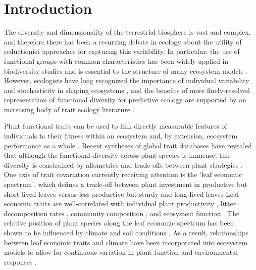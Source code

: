 \section{Introduction}
\label{sec:mvtraits-intro}

The diversity and dimensionality of the terrestrial biosphere is vast and complex, and therefore there has been a recurring debate in ecology about the utility of reductionist approaches for capturing this variability.
In particular, the use of functional groups with common characteristics has been widely applied in biodiversity studies \cite{naeem_disentangling_2003} and is essential to the structure of many ecosystem models \cite{lavorel_plant_1997,wullschleger_plant_2014}.
However, ecologists have long recognized the importance of individual variability and stochasticity in shaping ecosystems
\cite{gleason_individualistic_1926,bolnick_why_2011,rosindell_unified_2011,clark_why_2016},
and the benefits of more finely-resolved representation of functional diversity for predictive ecology are supported by an increasing body of trait ecology literature
\cite{mayfield_diversity_2006,mcmahon_improving_2011,van_bodegom_going_2012,reichstein_linking_2014,violle_emergence_2014,medlyn_using_2015,moran_intraspecific_2016}.

Plant functional traits can be used to link directly measurable features of individuals to their fitness within an ecosystem and, by extension, ecosystem performance as a whole \cite{violle_let_2007}.
Recent syntheses of global trait databases have revealed that although the functional diversity across plant species is immense, this diversity is constrained by allometries and trade-offs between plant strategies \cite{wright_worldwide_2004,kattge_try_2011,kleyer_why_2015,diaz_global_2016}.
One axis of trait covariation currently receiving attention is the ‘leaf economic spectrum’, which defines a trade-off between plant investment in productive but short-lived leaves versus less productive but sturdy and long-lived leaves \cite{wright_worldwide_2004,shipley_fundamental_2006,reich_world-wide_2014,diaz_global_2016}
Leaf economic traits are well-correlated with
individual plant productivity \cite{shipley_functional_2005,niinemets_within-canopy_2016,wu_convergence_2016},
litter decomposition rates \cite{bakker_leaf_2011,hobbie_plant_2015},
community composition \cite{burns_patterns_2004,cavender-bares_multiple_2004},
and ecosystem function \cite{diaz_plant_2004,musavi_imprint_2015}.
The relative position of plant species along the leaf economic spectrum has been shown to be influenced by climate and soil conditions
\cite{wright_worldwide_2004,wright_modulation_2005,cornwell_community_2009,ordonez_global_2009,wigley_leaf_2016}.
As a result, relationships between leaf economic traits and climate have been incorporated into ecosystem models to allow for continuous variation in plant function and environmental responses
\cite{sakschewski_leaf_2015,verheijen_inclusion_2015}.

